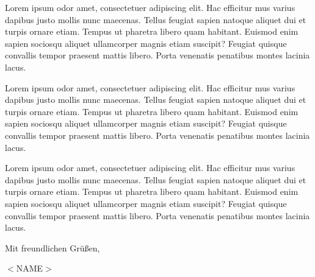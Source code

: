 \documentclass[11pt,a4paper]{article}
\begin{document}
Lorem ipsum odor amet, consectetuer adipiscing elit. Hac efficitur mus varius dapibus justo mollis nunc maecenas. 
Tellus feugiat sapien natoque aliquet dui et turpis ornare etiam. Tempus ut pharetra libero quam habitant. 
Euismod enim sapien sociosqu aliquet ullamcorper magnis etiam suscipit? Feugiat quisque convallis tempor praesent mattis libero. 
Porta venenatis penatibus montes lacinia lacus.

Lorem ipsum odor amet, consectetuer adipiscing elit. Hac efficitur mus varius dapibus justo mollis nunc maecenas. 
Tellus feugiat sapien natoque aliquet dui et turpis ornare etiam. Tempus ut pharetra libero quam habitant. 
Euismod enim sapien sociosqu aliquet ullamcorper magnis etiam suscipit? Feugiat quisque convallis tempor praesent mattis libero. 
Porta venenatis penatibus montes lacinia lacus.

Lorem ipsum odor amet, consectetuer adipiscing elit. Hac efficitur mus varius dapibus justo mollis nunc maecenas. 
Tellus feugiat sapien natoque aliquet dui et turpis ornare etiam. Tempus ut pharetra libero quam habitant. 
Euismod enim sapien sociosqu aliquet ullamcorper magnis etiam suscipit? Feugiat quisque convallis tempor praesent mattis libero. 
Porta venenatis penatibus montes lacinia lacus.

\vspace{1cm}

Mit freundlichen Grüßen,

\vspace{1cm}

$<$NAME$>$
\end{document}

